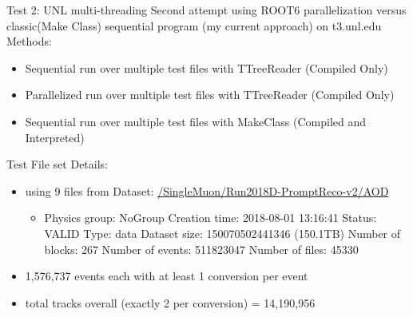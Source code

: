 \documentclass[10pt]{beamer}
\begin{document}
\begin{frame}{Test 2: UNL multi-threading}
Second attempt using ROOT6 parallelization versus classic(Make Class) sequential program (my current approach) on  t3.unl.edu\\
Methods:\\
\begin{itemize}
\item Sequential run over multiple test files with TTreeReader (Compiled Only)
\item Parallelized run over multiple test files with TTreeReader (Compiled Only)
\item Sequential run over multiple test files with MakeClass (Compiled and Interpreted)
\end{itemize} 

Test File set Details:\\
\begin{itemize}
\item using 9 files from Dataset: \url{/SingleMuon/Run2018D-PromptReco-v2/AOD }
\begin{itemize}
\tiny
	\item Physics group: NoGroup Creation time: 2018-08-01 13:16:41 Status: VALID Type: data Dataset size: 150070502441346 (150.1TB) Number of blocks: 267 Number of events: 511823047 Number of files: 45330 
	\end{itemize}
\normalsize
\item 1,576,737 events each with at least 1 conversion per event
\item total tracks overall (exactly 2 per conversion) = 14,190,956   
\end{itemize}

\end{frame}
\end{document}
